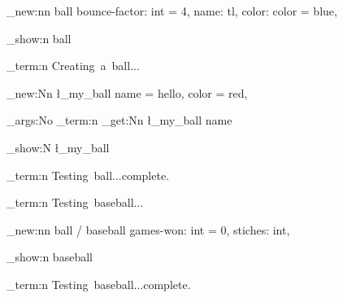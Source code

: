 \obj_new:nn { ball }
  {
    bounce-factor: int = 4,
    name: tl,
    color: color = blue,
  }

\obj_show:n { ball }


\msg_term:n { Creating~a~ball... }

\ball_new:Nn \l_my_ball
  {
    name = hello,
    color = red,
  }

\exp_args:No \msg_term:n { \ball_get:Nn \l_my_ball { name } }

\ball_show:N \l_my_ball

\msg_term:n { Testing~ball...complete. }


\msg_term:n { Testing~baseball... }

\obj_new:nn { ball / baseball }
  {
    games-won: int = 0,
    stiches: int,
  }

\obj_show:n { baseball }

\msg_term:n { Testing~baseball...complete. }


\bye
